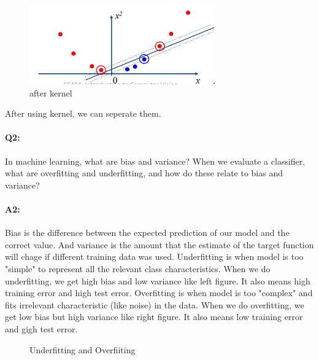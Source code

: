 \begin{figure}[!h]
    \centering
    \includegraphics[width=8cm]{q1_2.png}
    \caption{after kernel}
    \label{fig:Question1}
\end{figure}
After using kernel, we can seperate them. 




\pagebreak
\paragraph{Q2:} In machine learning, what are bias and variance? When we evaluate a classifier, what are overfitting and underfitting, and how do these relate to bias and variance?

\paragraph{A2:} Bias is the difference between the expected prediction of our model and the correct value. And variance is the amount that the estimate of the target function will chage if different training data was used. Underfitting is when model is too "simple" to represent all the relevant class characteristics. When we do underfitting, we get high bias and low variance like left figure. It also means high training error and high test error. Overfitting is when model is too "complex" and fits irrelevant characteristic (like noise) in the data. When we do overfitting, we get low bias but high variance like right figure. It also means low training error and gigh test error.

\begin{figure}[!h]
    \centering
    \caption{Underfitting and Overfiiting}
    \label{fig:Question2}
\end{figure}


